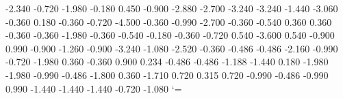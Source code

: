          {-2.340}
         {-0.720}
         {-1.980}
         {-0.180}
          {0.450}
         {-0.900}
         {-2.880}
         {-2.700}
         {-3.240}
         {-3.240}
         {-1.440}
         {-3.060}
         {-0.360}
          {0.180}
         {-0.360}
         {-0.720}
         {-4.500}
         {-0.360}
         {-0.990}
         {-2.700}
         {-0.360}
         {-0.540}
          {0.360}
          {0.360}
         {-0.360}
         {-0.360}
         {-1.980}
         {-0.360}
         {-0.540}
         {-0.180}
         {-0.360}
      {-0.720}
        {0.540}
     {-3.600}
      {0.540}
     {-0.900}
     {0.990}
        {-0.900}
        {-1.260}
     {-0.900}
   {-3.240}
       {-1.080}
       {-2.520}
     {-0.360}
      {-0.486}
   {-0.486}
     {-2.160}
      {-0.990}
     {-0.720}
  {-1.980}
       {0.360}
     {-0.360}
     {0.900}
         {0.234}
        {-0.486}
        {-0.486}
        {-1.188}
     {-1.440}
     {0.180}
     {-1.980}
  {-1.980}
       {-0.990}
   {-0.486}
       {-1.800}
      {0.360}
   {-1.710}
    {0.720}
    {0.315}
    {0.720}
 {-0.990}
     {-0.486}
     {-0.990}
    {0.990}
   {-1.440}
   {-1.440}
   {-1.440}
     {-0.720}
     {-1.080}
\endgroup
\catcode`\@=\current@catcode\relax
\endinput